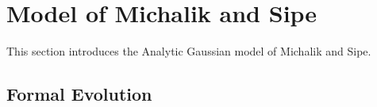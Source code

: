 
\section{Model of Michalik and Sipe}

This section introduces the Analytic Gaussian model of Michalik and Sipe.\cite{michalik_analytic_2006}

\subsection{Formal Evolution}

